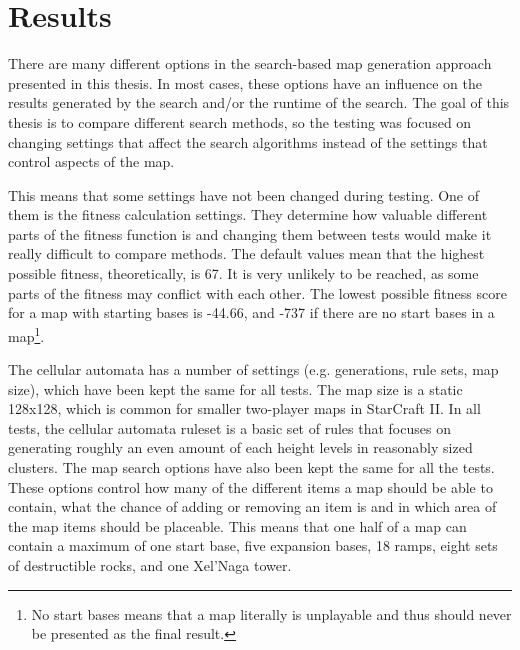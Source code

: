 \chapter{Results}
\label{results}
There are many different options in the search-based map generation approach presented in this thesis. In most cases, these options have an influence on the results generated by the search and/or the runtime of the search. The goal of this thesis is to compare different search methods, so the testing was focused on changing settings that affect the search algorithms instead of the settings that control aspects of the map.

This means that some settings have not been changed during testing. One of them is the fitness calculation settings. They determine how valuable different parts of the fitness function is and changing them between tests would make it really difficult to compare methods. The default values mean that the highest possible fitness, theoretically, is 67. It is very unlikely to be reached, as some parts of the fitness may conflict with each other. The lowest possible fitness score for a map with starting bases is -44.66, and -737 if there are no start bases in a map\footnote{No start bases means that a map literally is unplayable and thus should never be presented as the final result.}.

The cellular automata has a number of settings (e.g. generations, rule sets, map size), which have been kept the same for all tests. The map size is a static 128x128, which is common for smaller two-player maps in StarCraft II. In all tests, the cellular automata ruleset is a basic set of rules that focuses on generating roughly an even amount of each height levels in reasonably sized clusters. The map search options have also been kept the same for all the tests. These options control how many of the different items a map should be able to contain, what the chance of adding or removing an item is and in which area of the map items should be placeable. This means that one half of a map can contain a maximum of one start base, five expansion bases, 18 ramps, eight sets of destructible rocks, and one Xel'Naga tower. 




